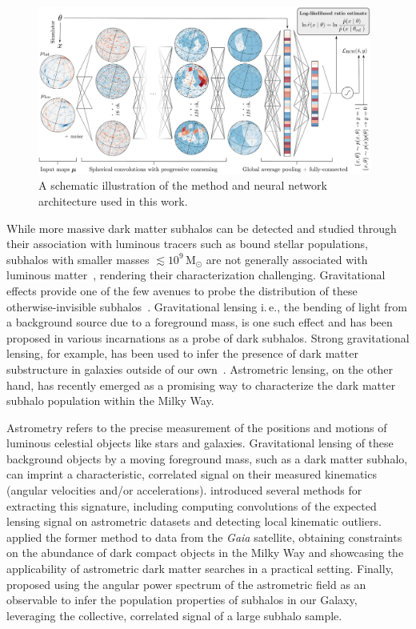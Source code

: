 \documentclass[twocolumn]{aastex631}
\newcommand{\ie}{{i.\,e.}\xspace}
\begin{document}
\begin{figure}[!htbp]
\centering
\includegraphics[width=0.98\textwidth]{figures/summary.pdf}
\caption{A schematic illustration of the method and neural network architecture used in this work.}
\label{fig:model}
\end{figure}

While more massive dark matter subhalos can be detected and studied through their association with luminous tracers such as bound stellar populations, subhalos with smaller masses $\lesssim 10^9\,\mathrm M_\odot$ are not generally associated with luminous matter~\citep{Fitts:2016usl,2017MNRAS.467.2019R}, rendering their characterization challenging. Gravitational effects provide one of the few avenues to probe the distribution of these otherwise-invisible subhalos~\citep{Buckley:2017ijx}. Gravitational lensing \ie, the bending of light from a background source due to a foreground mass, is one such effect and has been proposed in various incarnations as a probe of dark subhalos. 
Strong gravitational lensing, for example, has been used to infer the presence of dark matter substructure in galaxies outside of our own~\citep{Hezaveh:2016ltk,Vegetti:2009cz,Gilman:2019nap,Vegetti:2012mc}.
Astrometric lensing, on the other hand, has recently emerged as a promising way to characterize the dark matter subhalo population within the Milky Way.

Astrometry refers to the precise measurement of the positions and motions of luminous celestial objects like stars and galaxies. Gravitational lensing of these background objects by a moving foreground mass, such as a dark matter subhalo, can imprint a characteristic, correlated signal on their measured kinematics (angular velocities and/or accelerations). \citet{VanTilburg:2018ykj} introduced several methods for extracting this signature, including computing convolutions of the expected lensing signal on astrometric datasets and detecting local kinematic outliers. \citet{Mondino:2020rkn} applied the former method to data from the \emph{Gaia} satellite, obtaining constraints on the abundance of dark compact objects in the Milky Way and showcasing the applicability of astrometric dark matter searches in a practical setting. Finally, \citet{Mishra-Sharma:2020ynk} proposed using the angular power spectrum of the astrometric field as an observable to infer the population properties of subhalos in our Galaxy, leveraging the collective, correlated signal of a large subhalo sample. 
\end{document}
